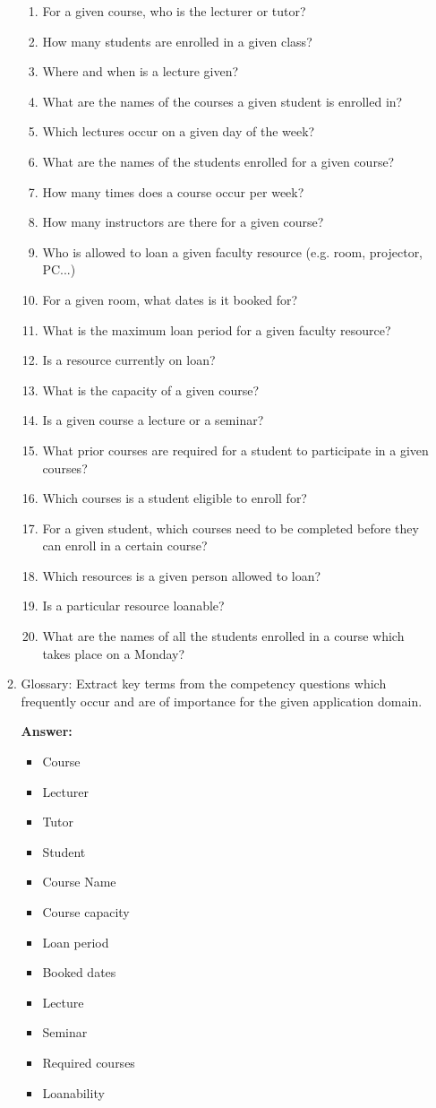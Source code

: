 \documentclass[10pt,a4paper]{article}
\begin{document}
\begin{enumerate}
\begin{enumerate}
\begin{enumerate}
\item For a given course, who is the lecturer or tutor?
\item How many students are enrolled in a given class?
\item Where and when is a lecture given?
\item What are the names of the courses a given student is enrolled in?
\item Which lectures occur on a given day of the week?
\item What are the names of the students enrolled for a given course?
\item How many times does a course occur per week?
\item How many instructors are there for a given course?
\item Who is allowed to loan a given faculty resource (e.g. room, projector, PC...)
\item For a given room, what dates is it booked for?
\item What is the maximum loan period for a given faculty resource?
\item Is a resource currently on loan?
\item What is the capacity of a given course?
\item Is a given course a lecture or a seminar?
\item What prior courses are required for a student to participate in a given courses?
\item Which courses is a student eligible to enroll for?
\item For a given student, which courses need to be completed before they can enroll in a certain course?
\item Which resources is a given person allowed to loan?
\item Is a particular resource loanable?
\item What are the names of all the students enrolled in a course which takes place on a Monday?
\end{enumerate}

\item Glossary: Extract key terms from the competency questions which frequently occur and are of importance for the given application domain. 

\textbf{Answer:}

\begin{itemize}
\item Course
\item Lecturer
\item Tutor
\item Student
\item Course Name
\item Course capacity
\item Loan period
\item Booked dates
\item Lecture 
\item Seminar
\item Required courses
\item Loanability
\end{itemize}


\end{enumerate}
\end{enumerate}
\end{document}
